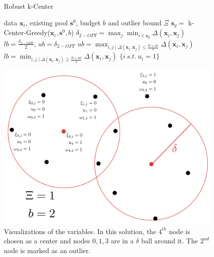 \documentclass{article} %
\begin{document}
\begin{figure}[h]
    \begin{minipage}[t]{0.5\textwidth}
    \vspace{-3mm} 
    \begin{algorithm}[H]
        \caption{Robust k-Center} 
        \label{alg:bin} 
        \begin{algorithmic} 
         data $\mathbf{x}_i$,
            existing pool $\mathbf{s}^0$, budget $b$ and outlier bound $\Xi$ 
          $\mathbf{s}_g
            =$ k-Center-Greedy($\mathbf{x}_i, \mathbf{s}^0, b$) 
            \STATE $\delta_{2-OPT} = \max_j \min_{i \in
            \mathbf{s}_g} \Delta(\mathbf{x}_i,\mathbf{x}_j)$ 
            \STATE $lb=\frac{\delta_{2-OPT}}{2}$, $ub=\delta_{2-OPT}$
            \REPEAT {} 
            \STATE $ub=\max_{i,j \mid
            \Delta(\mathbf{x}_i,\mathbf{x}_j) \leq \frac{lb+ub}{2}}  \Delta(\mathbf{x}_i,\mathbf{x}_j) $ 
            \ELSE 
            \STATE
        $lb=\min_{i,j \mid   \Delta(\mathbf{x}_i,\mathbf{x}_j) \geq \frac{lb+ub}{2}}  \Delta(\mathbf{x}_i,\mathbf{x}_j)
        $ 
        \ENDIF 
         $\{i\ s.t.\ u_i=1\}$ 
\end{algorithmic} 
\end{algorithm}
\end{minipage} \quad
\begin{minipage}[t]{0.45\textwidth}
\vspace{-1mm}
\includegraphics[width=\textwidth]{mip.pdf}
\vspace{-5mm}
\caption{Visualizations of the variables. In this solution, the $4^{th}$ node is chosen as a center and nodes $0,1,3$ are in a $\delta$ ball around it. The $2^{nd}$ node is marked as an outlier.} \label{mip}  
\end{minipage}
\end{figure}
\end{document}
